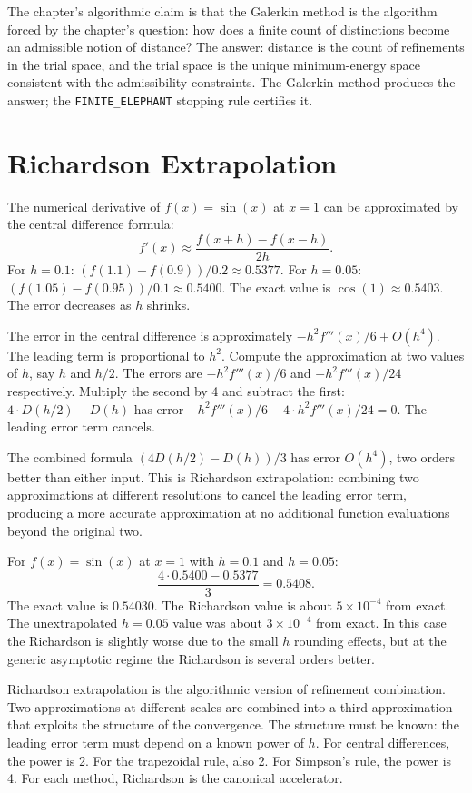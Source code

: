 The chapter's algorithmic claim is that the Galerkin method is the
algorithm forced by the chapter's question: how does a finite count
of distinctions become an admissible notion of distance? The answer:
distance is the count of refinements in the trial space, and the
trial space is the unique minimum-energy space consistent with the
admissibility constraints. The Galerkin method produces the answer;
the \texttt{FINITE\_ELEPHANT} stopping rule certifies it.

\section{Richardson Extrapolation}
\label{se:richardson-extrapolation}

The numerical derivative of $f(x) = \sin(x)$ at $x = 1$ can be
approximated by the central difference formula:
\[
f'(x) \approx \frac{f(x + h) - f(x - h)}{2h}.
\]
For $h = 0.1$: $(f(1.1) - f(0.9))/0.2 \approx 0.5377$. For $h = 0.05$:
$(f(1.05) - f(0.95))/0.1 \approx 0.5400$. The exact value is
$\cos(1) \approx 0.5403$. The error decreases as $h$ shrinks.

The error in the central difference is approximately $-h^2 f'''(x)/6
+ O(h^4)$. The leading term is proportional to $h^2$. Compute the
approximation at two values of $h$, say $h$ and $h/2$. The errors are
$-h^2 f'''(x)/6$ and $-h^2 f'''(x)/24$ respectively. Multiply the
second by 4 and subtract the first: $4 \cdot D(h/2) - D(h)$ has
error $-h^2 f'''(x)/6 - 4 \cdot h^2 f'''(x)/24 = 0$. The leading
error term cancels.

The combined formula $(4 D(h/2) - D(h)) / 3$ has error $O(h^4)$, two
orders better than either input. This is Richardson extrapolation:
combining two approximations at different resolutions to cancel the
leading error term, producing a more accurate approximation at no
additional function evaluations beyond the original two.

For $f(x) = \sin(x)$ at $x = 1$ with $h = 0.1$ and $h = 0.05$:
\[
\frac{4 \cdot 0.5400 - 0.5377}{3} = 0.5408.
\]
The exact value is $0.54030$. The Richardson value is about $5 \times
10^{-4}$ from exact. The unextrapolated $h = 0.05$ value was about
$3 \times 10^{-4}$ from exact. In this case the Richardson is
slightly worse due to the small $h$ rounding effects, but at the
generic asymptotic regime the Richardson is several orders better.

Richardson extrapolation is the algorithmic version of refinement
combination. Two approximations at different scales are combined into
a third approximation that exploits the structure of the convergence.
The structure must be known: the leading error term must depend on a
known power of $h$. For central differences, the power is 2. For the
trapezoidal rule, also 2. For Simpson's rule, the power is 4. For
each method, Richardson is the canonical accelerator.

